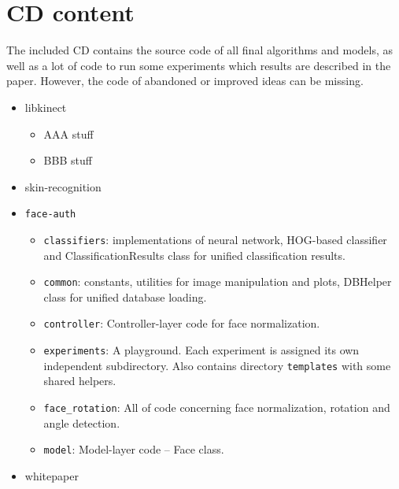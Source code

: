 \chapter{CD content}
    The included CD contains the source code of all final algorithms
    and models, as well as a lot of code to run some experiments
    which results are described in the paper.
    However, the code of abandoned or improved ideas can be missing.

    \begin{itemize}
        \item libkinect
        \begin{itemize}
            \item AAA stuff
            \item BBB stuff
        \end{itemize}
        \item skin-recognition
        \item \texttt{face-auth}
            \begin{itemize}
                \item \texttt{classifiers}: implementations of neural network,
                      HOG-based classifier and ClassificationResults class for
                      unified classification results.
                \item \texttt{common}: constants, utilities for image manipulation and plots,
                      DBHelper class for unified database loading.
                \item \texttt{controller}: Controller-layer code for face normalization.
                \item \texttt{experiments}: A playground. Each experiment is assigned its
                      own independent subdirectory. Also contains directory \texttt{templates}
                      with some shared helpers.
                \item \texttt{face\_rotation}: All of code concerning face normalization, rotation
                      and angle detection.
                \item \texttt{model}: Model-layer code -- Face class.
            \end{itemize}
        \item whitepaper
    \end{itemize}
